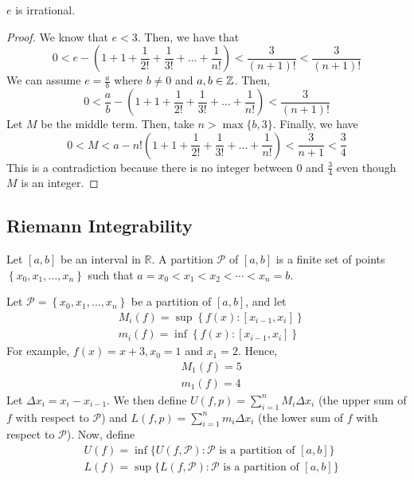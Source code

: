\begin{theorem}
    $e$ is irrational.
\end{theorem}
\begin{proof}
    We know that $e < 3$. Then, we have that $$0 < e - \left(1 + 1 + \frac{1}{2!} + \frac{1}{3!} + \ldots + \frac{1}{n!}\right) < \frac{3}{(n + 1)!} < \frac{3}{(n + 1)!}$$
    We can assume $e = \frac{a}{b}$ where $b \neq 0$ and $a, b \in \mathbb{Z}$. Then, $$0 < \frac{a}{b} - \left(1 + 1 + \frac{1}{2!} + \frac{1}{3!} + \ldots + \frac{1}{n!}\right) < \frac{3}{(n+1)!}$$
    Let $M$ be the middle term. Then, take $n > \max\{b, 3\}$. Finally, we have $$0 < M < a - n!\left(1 + 1 + \frac{1}{2!} + \frac{1}{3!} + \ldots + \frac{1}{n!}\right) < \frac{3}{n + 1} < \frac{3}{4}$$
    This is a contradiction because there is no integer between 0 and $\frac{3}{4}$ even though $M$ is an integer.
\end{proof}


\subsection{Riemann Integrability}
\begin{definition}[Partition]
    Let $[a, b]$ be an interval in $\mathbb{R}$. A partition $\mathcal{P}$ of $[a, b]$ is a finite set of points $\left\{x_0, x_1, \ldots, x_n\right\}$ such that $a=x_0<x_1<x_2<\cdots<x_n=b$.
\end{definition}

\begin{definition}
    Let $\mathcal{P}=\left\{x_0, x_1, \ldots, x_n\right\}$ be a partition of $[a, b]$, and let
    \begin{align*}
        &M_i(f)=\sup \left\{f(x):\left[x_{i-1}, x_i\right]\right\} \\
        &m_i(f)=\inf \left\{f(x):\left[x_{i-1}, x_i\right]\right\}
    \end{align*}
    For example, $f(x)=x+3, x_0=1$ and $x_1=2$. Hence,
    \begin{align*}
        &M_1(f)=5 \\
        &m_1(f)=4
    \end{align*}
    Let $\Delta x_i=x_i-x_{i-1}$. We then define $U(f, p)=\sum_{i=1}^n M_i \Delta x_i$ (the upper sum of $f$ with respect to $\mathcal{P}$) and $L(f, p)=\sum_{i=1}^n m_i \Delta x_i$ (the lower sum of $f$ with respect to $\mathcal{P}$). Now, define
    \begin{align*}
        &U(f)=\inf \{U(f, \mathcal{P}): \mathcal{P} \text { is a partition of }[a, b]\} \\
        &L(f)=\sup \{L(f, \mathcal{P}): \mathcal{P} \text { is a partition of }[a, b]\}
    \end{align*}
\end{definition}

